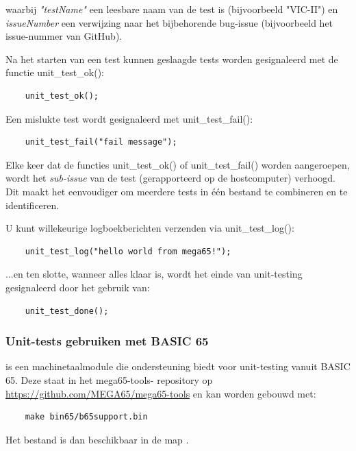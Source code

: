 waarbij \textit{"testName"} een leesbare naam van de test is (bijvoorbeeld
"VIC-II") en \textit{issueNumber} een verwijzing naar het bijbehorende
bug-issue (bijvoorbeeld het issue-nummer van GitHub).

Na het starten van een test kunnen geslaagde tests worden gesignaleerd met
de functie unit\_test\_ok():

\begin{verbatim}
    unit_test_ok();
\end{verbatim}

Een mislukte test wordt gesignaleerd met unit\_test\_fail():

\begin{verbatim}
    unit_test_fail("fail message");
\end{verbatim}

Elke keer dat de functies unit\_test\_ok() of unit\_test\_fail()
worden aangeroepen, wordt het \textit{sub-issue} van de test (gerapporteerd op de
hostcomputer) verhoogd. Dit maakt het eenvoudiger om meerdere tests in één bestand te combineren en
te identificeren.

U kunt willekeurige logboekberichten verzenden via unit\_test\_log():

\begin{verbatim}
    unit_test_log("hello world from mega65!");
\end{verbatim}

...en ten slotte, wanneer alles klaar is, wordt het einde van unit-testing gesignaleerd
door het gebruik van:

\begin{verbatim}
    unit_test_done();
\end{verbatim}


\subsubsection{Unit-tests gebruiken met BASIC 65}

 is een machinetaalmodule die ondersteuning biedt voor
unit-testing vanuit BASIC 65. Deze staat in het mega65-tools-
repository op \url{https://github.com/MEGA65/mega65-tools} en kan worden gebouwd met:

\begin{verbatim}
    make bin65/b65support.bin
\end{verbatim}

Het bestand  is dan beschikbaar in de map .

